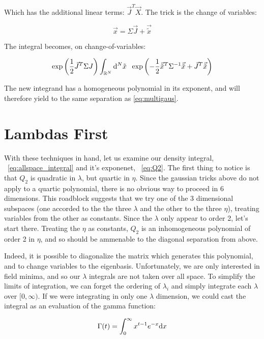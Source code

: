 \documentclass[10pt,letterpaper]{article}
\def\d{{\rm d}}  %
\begin{document}
Which has the additional linear terms: $\vec{J}^T \vec{X}$. The trick is the change of variables:

$$\vec{x} = \Sigma \vec{J} + \vec{\tilde{x}}$$

The integral becomes, on change-of-variables:

\begin{equation} \label{eq:multigaus_lintrick}
\exp\left(\frac{1}{2}\vec{J}^T \Sigma J\right) \int_{\mathbb{R}^N} \d^N \tilde{x} \hspace{0.5pc} \exp\left(-\frac{1}{2} \vec{\tilde{x}}^T \Sigma^{-1} \vec{\tilde{x}} + \vec{J}^T \vec{\tilde{x}}\right)
\end{equation}

The new integrand has a homogeneous polynomial in its exponent, and will therefore yield to the same separation as \ref{eq:multigaus}.

\section{Lambdas First} \label{lambdasec}

With these techniques in hand, let us examine our density integral, ~\ref{eq:allspace_integral} and it's exponenet, ~\ref{eq:Q2}. The first thing to notice is that $Q_2$ is quadratic in $\lambda$, but quartic in $\eta$. Since the gaussian tricks above do not apply to a quartic polynomial, there is no obvious way to proceed in 6 dimensions. This roadblock suggests that we try one of the 3 dimensional subspaces (one accorded to the the three $\lambda$ and the other to the three $\eta$), treating variables from the other as constants. Since the $\lambda$ only appear to order 2, let's start there. Treating the $\eta$ as constants, $Q_2$ is an inhomogeneous polynomial of order 2 in $\eta$, and so should be ammenable to the diagonal separation from above.
\par Indeed, it is possible to diagonalize the matrix which generates this polynomial, and to change variables to the eigenbasis. Unfortunately, we are only interested in field minima, and so our $\lambda$ integrals are not taken over all space. To simplify the limits of integration, we can forget the ordering of $\lambda_i$ and simply integrate each $\lambda$ over $[0,\infty)$. If we were integrating in only one $\lambda$ dimension, we could cast the integral as an evaluation of the gamma function:

\begin{equation} \label{eq:gamma}
\Gamma(t) = \int_{0}^{\infty} x^{t-1} e^{-x} \d x
\end{equation}
\end{document}
